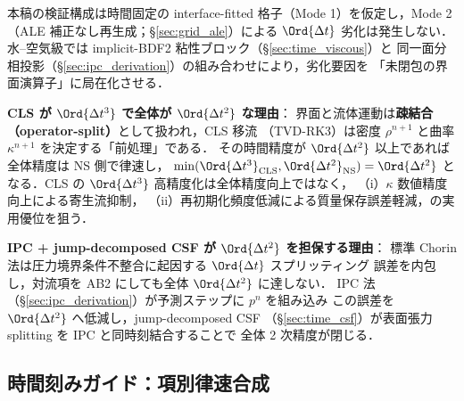 本稿の検証構成は時間固定の interface-fitted 格子（Mode 1）を仮定し，Mode 2（ALE
補正なし再生成；§\ref{sec:grid_ale}）による $\Ord{\Delta t}$ 劣化は発生しない．
水--空気級では implicit-BDF2 粘性ブロック（§\ref{sec:time_viscous}）と
同一面分相投影（§\ref{sec:ipc_derivation}）の組み合わせにより，劣化要因を
「未閉包の界面演算子」に局在化させる．

\noindent\textbf{CLS が $\Ord{\Delta t^3}$ で全体が $\Ord{\Delta t^2}$ な理由}：
界面と流体運動は\textbf{疎結合（operator-split）}として扱われ，CLS 移流
（TVD-RK3）は密度 $\rho^{n+1}$ と曲率 $\kappa^{n+1}$ を決定する「前処理」である．
その時間精度が $\Ord{\Delta t^2}$ 以上であれば全体精度は NS 側で律速し，
$\min(\Ord{\Delta t^3}_\text{CLS},\Ord{\Delta t^2}_\text{NS}) = \Ord{\Delta t^2}$
となる．CLS の $\Ord{\Delta t^3}$ 高精度化は全体精度向上ではなく，
（i）$\kappa$ 数値精度向上による寄生流抑制，
（ii）再初期化頻度低減による質量保存誤差軽減，の実用優位を狙う．

\noindent\textbf{IPC + jump-decomposed CSF が $\Ord{\Delta t^2}$ を担保する理由}：
標準 Chorin 法は圧力境界条件不整合に起因する $\Ord{\Delta t}$ スプリッティング
誤差を内包し，対流項を AB2 にしても全体 $\Ord{\Delta t^2}$ に達しない．
IPC 法（§\ref{sec:ipc_derivation}）が予測ステップに $p^n$ を組み込み
この誤差を $\Ord{\Delta t^2}$ へ低減し，jump-decomposed CSF
（§\ref{sec:time_csf}）が表面張力 splitting を IPC と同時刻結合することで
全体 2 次精度が閉じる．

\subsection{時間刻みガイド：項別律速合成}%
\label{sec:time_guide}
\label{sec:dt_synthesis}%
\label{sec:stability}%

